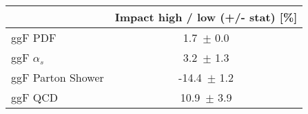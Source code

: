 \begin{tabular}{| l || c  | }
\hline
 & Impact high / low (+/- stat) [\%] \tabularnewline
\hline
ggF PDF & 1.7\, $\pm$  0.0 \tabularnewline
ggF $\alpha_s$ & 3.2\, $\pm$  1.3 \tabularnewline
ggF Parton Shower & -14.4\, $\pm$  1.2 \tabularnewline
ggF QCD  & 10.9\, $\pm$  3.9 \tabularnewline
\end{tabular}